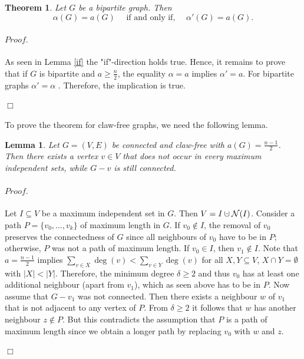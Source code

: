 \documentclass{scrartcl}
\newtheorem{theorem}[defsatzusw]{Theorem}
\newtheorem{lemma}[defsatzusw]{Lemma}
\newenvironment{proof}{\paragraph{$\mathit{Proof.}$}
	\vspace{-.4cm}\hspace{-.3cm}}{\vspace{-.2cm}\begin{flushright}$\Box$\end{flushright}}
\newcommand{\cupdot}{\mathbin{\mathaccent\cdot\cup}}
\begin{document}
	\begin{theorem}
		Let $G$ be a bipartite graph. Then $$\alpha(G)=a(G) \quad\text{ if and only if, }\quad	
		\alpha'(G)=a(G).$$
	\end{theorem}
	
	\begin{proof}
		As seen in Lemma \ref{if} the "if"-direction holds true. 
		Hence, it remains to prove that if $G$ is bipartite and $a\geq \frac n2$, the equality $\alpha=a$ implies $\alpha'=a$.
		For bipartite graphs $\alpha'=\alpha$ \cite{Larson2011}. Therefore, the implication is true.\vspace{-.54cm}
	\end{proof}
	
	\noindent
	To prove the theorem for claw-free graphs, we need the following lemma.
	
	\begin{lemma}\label{exist}
		Let $G=(V,E)$ be connected and claw-free with $a(G)=\frac{n-1}{2}$. Then there exists a vertex $v\in V$ that does not occur in every maximum independent sets, while $G-v$ is still connected.
	\end{lemma}
	\begin{proof}
		Let $I\subseteq V$ be a maximum independent set in $G$.
		Then $V=I \cupdot \mathcal{N}(I)$.
		Consider a path $P=\{v_0,\dots,v_k\}$ of maximum length in $G$.
		If $v_0\not\in I$, the removal of $v_0$ preserves the connectedness of $G$ since all neighbours of $v_0$ have to be in $P$; otherwise, $P$ was not a path of maximum length. 
		If $v_0\in I$, then $v_1\not\in I$.
		Note that $a=\frac{n-1}{2}$ implies $\sum_{v\in X}\deg(v)<\sum_{v\in Y}\deg(v)$ for all $X,Y\subseteq V$, $X\cap Y=\emptyset$ with $|X|<|Y|$.
		Therefore, the minimum degree $\delta\geq 2$ and thus $v_0$ has at least one additional neighbour (apart from $v_1$), which as seen above has to be in $P$.
		Now assume that $G-v_1$ was not connected. 
		Then there exists a neighbour $w$ of $v_1$ that is not adjacent to any vertex of $P$.
		From $\delta\geq 2$ it follows that $w$ has another neighbour $z\not\in P$.
		But this contradicts the assumption that $P$ is a path of maximum length since we obtain a longer path by replacing $v_0$ with $w$ and $z$.\vspace{-.53cm}
	\end{proof}
	
\end{document}
